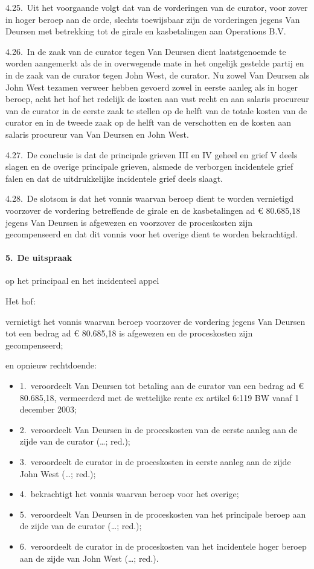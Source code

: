 \documentclass[
  dutch,
  a4paper,
]{article}
\begin{document}
4.25. Uit het voorgaande volgt dat van de vorderingen van de curator, voor zover in hoger beroep aan de orde, slechts toewijsbaar zijn de vorderingen jegens Van Deursen met betrekking tot de girale en kasbetalingen aan Operations B.V.

4.26. In de zaak van de curator tegen Van Deursen dient laatstgenoemde te worden aangemerkt als de in overwegende mate in het ongelijk gestelde partij en in de zaak van de curator tegen John West, de curator. Nu zowel Van Deursen als John West tezamen verweer hebben gevoerd zowel in eerste aanleg als in hoger beroep, acht het hof het redelijk de kosten aan vast recht en aan salaris procureur van de curator in de eerste zaak te stellen op de helft van de totale kosten van de curator en in de tweede zaak op de helft van de verschotten en de kosten aan salaris procureur van Van Deursen en John West.

4.27. De conclusie is dat de principale grieven III en IV geheel en grief V deels slagen en de overige principale grieven, alsmede de verborgen incidentele grief falen en dat de uitdrukkelijke incidentele grief deels slaagt.

4.28. De slotsom is dat het vonnis waarvan beroep dient te worden vernietigd voorzover de vordering betreffende de girale en de kasbetalingen ad € 80.685,18 jegens Van Deursen is afgewezen en voorzover de proceskosten zijn gecompenseerd en dat dit vonnis voor het overige dient te worden bekrachtigd.

\paragraph{5. De uitspraak}\label{de-uitspraak}

op het principaal en het incidenteel appel

Het hof:

vernietigt het vonnis waarvan beroep voorzover de vordering jegens Van Deursen tot een bedrag ad € 80.685,18 is afgewezen en de proceskosten zijn gecompenseerd;

en opnieuw rechtdoende:

\begin{itemize}
\item
  1. veroordeelt Van Deursen tot betaling aan de curator van een bedrag ad € 80.685,18, vermeerderd met de wettelijke rente ex artikel 6:119 BW vanaf 1 december 2003;
\item
  2. veroordeelt Van Deursen in de proceskosten van de eerste aanleg aan de zijde van de curator (\ldots; red.);
\item
  3. veroordeelt de curator in de proceskosten in eerste aanleg aan de zijde John West (\ldots; red.);
\item
  4. bekrachtigt het vonnis waarvan beroep voor het overige;
\item
  5. veroordeelt Van Deursen in de proceskosten van het principale beroep aan de zijde van de curator (\ldots; red.);
\item
  6. veroordeelt de curator in de proceskosten van het incidentele hoger beroep aan de zijde van John West (\ldots; red.).
\end{itemize}
\end{document}
